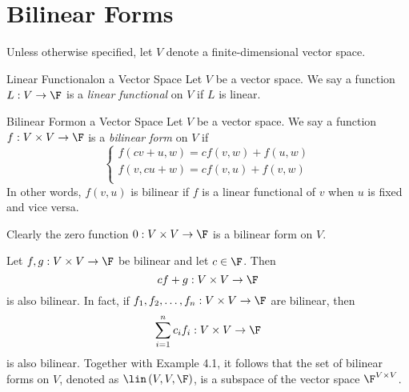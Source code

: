 \documentclass[math_245.tex]{subfiles}
\begin{document}

    \section{Bilinear Forms}

    \noindent Unless otherwise specified, let $V$ denote a finite-dimensional vector space.


    \begin{recall}{Linear Functional}{on a Vector Space}
        Let $V$ be a vector space. We say a function $L:V\to\F$ is a \emph{linear functional} on $V$ if $L$ is linear.
    \end{recall}

    \begin{definition}{Bilinear Form}{on a Vector Space}
        Let $V$ be a vector space. We say a function $f:V\times V\to\F$ is a \emph{bilinear form} on $V$ if
        \begin{equation*}
            \begin{cases}
                f(cv+u,w) = cf(v,w)+f(u,w) \\
                f(v,cu+w) = cf(v,u)+f(v,w) \\
            \end{cases}
        \end{equation*}
        In other words, $f(v,u)$ is bilinear if $f$ is a linear functional of $v$ when $u$ is fixed and vice versa.
    \end{definition}

    \begin{example}
        Clearly the zero function $0:V\times V\to \F$ is a bilinear form on $V$.
    \end{example}

    \begin{remark}
        Let $f,g:V\times V\to\F$ be bilinear and let $c\in\F$. Then
        \begin{equation*}
            cf+g:V\times V\to\F
        \end{equation*}
        is also bilinear. In fact, if $f_1,f_2,\ldots,f_n: V\times V\to\F$ are bilinear, then
        \begin{equation*}
            \sum^{n}_{i=1} c_if_i: V\times V\to\F 
        \end{equation*}
        is also bilinear. Together with Example 4.1, it follows that the set of bilinear forms on $V$, denoted as $\lin\left( V,V,\F \right)$, is a subspace of the vector space $\F^{V\times V}$.
    \end{remark}
\end{document}

